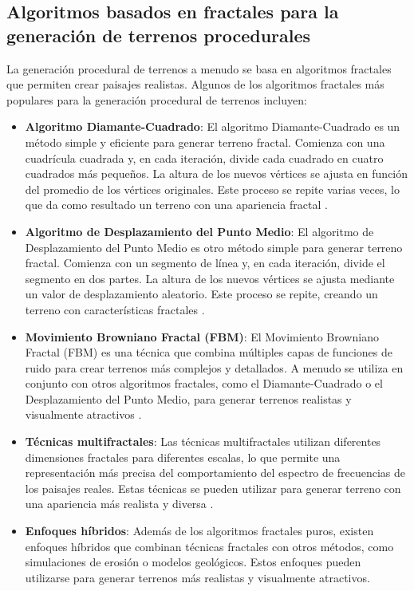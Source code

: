 \subsection{Algoritmos basados en fractales para la generación de terrenos procedurales}

La generación procedural de terrenos a menudo se basa en algoritmos fractales que permiten crear paisajes realistas. Algunos de los algoritmos fractales más populares para la generación procedural de terrenos incluyen:

\begin{itemize}
    \item \textbf{Algoritmo Diamante-Cuadrado}: El algoritmo Diamante-Cuadrado es un método simple y eficiente para generar terreno fractal. Comienza con una cuadrícula cuadrada y, en cada iteración, divide cada cuadrado en cuatro cuadrados más pequeños. La altura de los nuevos vértices se ajusta en función del promedio de los vértices originales. Este proceso se repite varias veces, lo que da como resultado un terreno con una apariencia fractal \cite{DiamanteCuadrado}.
    
    \item \textbf{Algoritmo de Desplazamiento del Punto Medio}: El algoritmo de Desplazamiento del Punto Medio es otro método simple para generar terreno fractal. Comienza con un segmento de línea y, en cada iteración, divide el segmento en dos partes. La altura de los nuevos vértices se ajusta mediante un valor de desplazamiento aleatorio. Este proceso se repite, creando un terreno con características fractales \cite{DesplazamientoPuntoMedio}.
    
    \item \textbf{Movimiento Browniano Fractal (FBM)}: El Movimiento Browniano Fractal (FBM) es una técnica que combina múltiples capas de funciones de ruido para crear terrenos más complejos y detallados. A menudo se utiliza en conjunto con otros algoritmos fractales, como el Diamante-Cuadrado o el Desplazamiento del Punto Medio, para generar terrenos realistas y visualmente atractivos \cite{FractalBrownianoMotion}.
    
    \item \textbf{Técnicas multifractales}: Las técnicas multifractales utilizan diferentes dimensiones fractales para diferentes escalas, lo que permite una representación más precisa del comportamiento del espectro de frecuencias de los paisajes reales. Estas técnicas se pueden utilizar para generar terreno con una apariencia más realista y diversa \cite{TecnicasMultifractales}.
    
    \item \textbf{Enfoques híbridos}: Además de los algoritmos fractales puros, existen enfoques híbridos que combinan técnicas fractales con otros métodos, como simulaciones de erosión o modelos geológicos. Estos enfoques pueden utilizarse para generar terrenos más realistas y visualmente atractivos.
\end{itemize}

